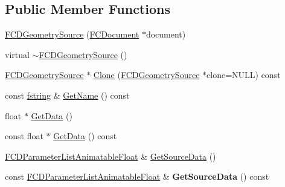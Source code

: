 \subsection*{Public Member Functions}
\begin{DoxyCompactItemize}
\item 
\hyperlink{classFCDGeometrySource_a02597e76122f43117f30b0c89739e819}{FCDGeometrySource} (\hyperlink{classFCDocument}{FCDocument} $\ast$document)
\item 
virtual \hyperlink{classFCDGeometrySource_a752a3a52c5cf4df2173616a332eff9a9}{$\sim$FCDGeometrySource} ()
\item 
\hyperlink{classFCDGeometrySource}{FCDGeometrySource} $\ast$ \hyperlink{classFCDGeometrySource_a663219a15914187c3b6c31a3a6ba1dc4}{Clone} (\hyperlink{classFCDGeometrySource}{FCDGeometrySource} $\ast$clone=NULL) const 
\item 
const \hyperlink{classfm_1_1stringT}{fstring} \& \hyperlink{classFCDGeometrySource_a50fbd22bd142ca689a7b5fb42d9e47eb}{GetName} () const 
\item 
float $\ast$ \hyperlink{classFCDGeometrySource_a450adee10f06fc187f62cd9ecb6567bb}{GetData} ()
\item 
const float $\ast$ \hyperlink{classFCDGeometrySource_a1dcd473a747b643cdd7cdf03499e5a04}{GetData} () const 
\item 
\hyperlink{classFCDParameterListAnimatableT}{FCDParameterListAnimatableFloat} \& \hyperlink{classFCDGeometrySource_a9fcede2e0dcb96722ffec269d6748a97}{GetSourceData} ()
\item 
\hypertarget{classFCDGeometrySource_a2301514d5678d6e123fcb867a7219c7c}{
const \hyperlink{classFCDParameterListAnimatableT}{FCDParameterListAnimatableFloat} \& {\bfseries GetSourceData} () const }
\label{classFCDGeometrySource_a2301514d5678d6e123fcb867a7219c7c}


\end{DoxyCompactItemize}
